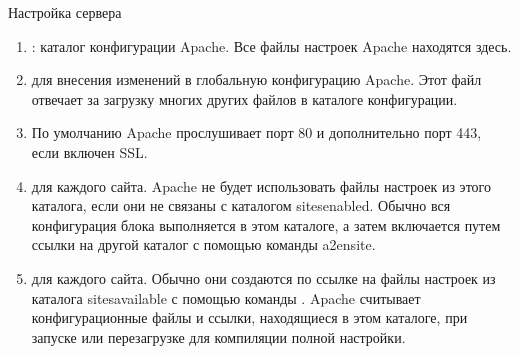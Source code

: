 \documentclass[letterpaper,10pt,russian]{sphinxmanual}
\begin{document}
\sphinxAtStartPar
Настройка сервера
\begin{enumerate}
%
\item {} 
\sphinxAtStartPar
{}: каталог конфигурации Apache. Все файлы настроек Apache находятся здесь.

\item {} \begin{description}
\sphinxAtStartPar
для внесения изменений в глобальную конфигурацию Apache. Этот файл отвечает за загрузку
многих других файлов в каталоге конфигурации.

\end{description}

\item {} \begin{description}
\sphinxAtStartPar
По умолчанию Apache прослушивает порт 80 и дополнительно порт 443, если включен SSL.

\end{description}

\item {} \begin{description}
\sphinxAtStartPar
для каждого сайта. Apache не будет использовать файлы настроек из этого каталога,
если они не связаны с каталогом sites\sphinxhyphen{}enabled. Обычно вся конфигурация блока выполняется
в этом каталоге, а затем включается путем ссылки на другой каталог с помощью команды a2ensite.

\end{description}

\item {} \begin{description}
\sphinxAtStartPar
для каждого сайта. Обычно они создаются по ссылке на файлы настроек из каталога sites\sphinxhyphen{}available
с помощью команды . Apache считывает конфигурационные файлы и ссылки, находящиеся
в этом каталоге, при запуске или перезагрузке для компиляции полной настройки.


\end{description}
\end{enumerate}
\end{document}
